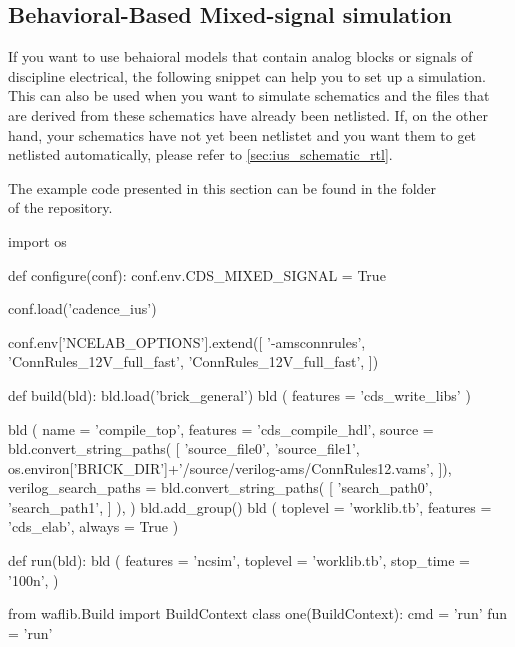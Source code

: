 \clearpage
\subsection{Behavioral-Based Mixed-signal simulation}
\label{sec:ius_behave_rtl}
If you want to use  behaioral models that contain analog blocks
or signals of discipline electrical, the following  snippet can
help you to set up a simulation. This  can also be used when you
want to simulate schematics and the  files that are derived
from these schematics have already been netlisted. If, on the other hand, your
schematics have not yet been netlistet and you want them to get netlisted
automatically, please refer to \cref{sec:ius_schematic_rtl}.

The example code presented in this section can be found in the folder\\
 of the repository.

\begin{lstwscript}
import os

def configure(conf):
    conf.env.CDS_MIXED_SIGNAL = True

    conf.load('cadence_ius')

    conf.env['NCELAB_OPTIONS'].extend([
        '-amsconnrules', 'ConnRules_12V_full_fast',
        'ConnRules_12V_full_fast',
    ])

def build(bld):
    bld.load('brick_general')
    bld ( features = 'cds_write_libs' )

    bld (
        name = 'compile_top',
        features = 'cds_compile_hdl',
        source = bld.convert_string_paths(
            [
                'source_file0',
                'source_file1',
                os.environ['BRICK_DIR']+'/source/verilog-ams/ConnRules12.vams',
            ]),
        verilog_search_paths = bld.convert_string_paths(
            [
                'search_path0',
                'search_path1',
            ]
        ),
    )
    bld.add_group()
    bld (
        toplevel = 'worklib.tb',
        features = 'cds_elab',
        always = True
    )   

def run(bld):
    bld (
        features = 'ncsim',
        toplevel = 'worklib.tb',
        stop_time = '100n',
    )   

from waflib.Build import BuildContext
class one(BuildContext):
    cmd = 'run'
    fun = 'run'
\end{lstwscript}

